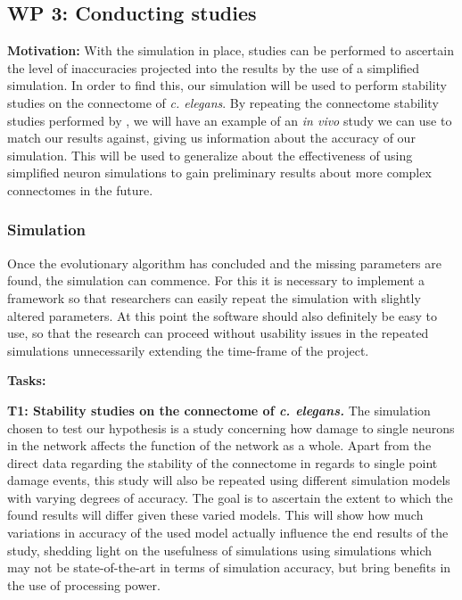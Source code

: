 \documentclass[a4paper,11pt]{article}
\begin{document}
\subsection{WP 3: Conducting studies}

\textbf{Motivation:}
With the simulation in place, studies can be performed to ascertain the level of inaccuracies projected into the results by the use of a simplified simulation. In order to find this, our simulation will be used to perform stability studies on the connectome of \emph{c. elegans}. By repeating the connectome stability studies performed by , we will have an example of an \emph{in vivo} study we can use to match our results against, giving us information about the accuracy of our simulation. This will be used to generalize about the effectiveness of using simplified neuron simulations to gain preliminary results about more complex connectomes in the future. 


\subsubsection{Simulation}
Once the evolutionary algorithm has concluded and the missing parameters are found, the simulation can commence. For this it is necessary to implement a framework so that researchers can easily repeat the simulation with slightly altered parameters. At this point the software should also definitely be easy to use, so that the research can proceed without usability issues in the repeated simulations unnecessarily extending the time-frame of the project.

\textbf{Tasks:}

\textbf{T1: Stability studies on the connectome of \emph{c. elegans.}}
The simulation chosen to test our hypothesis is a study concerning how damage to single neurons in the network affects the function of the network as a whole.
Apart from the direct data regarding the stability of the connectome in regards to single point damage events, this study will also be repeated using different simulation models with varying degrees of accuracy. The goal is to ascertain the extent to which the found results will differ given these varied models. This will show how much variations in accuracy of the used model actually influence the end results of the study, shedding light on the usefulness of simulations using simulations which may not be state-of-the-art in terms of simulation accuracy, but bring benefits in the use of processing power. 
\end{document}
